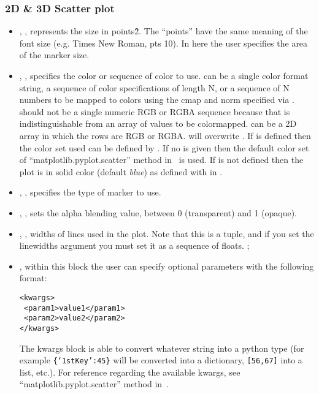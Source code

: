 \subsubsection{2D \& 3D Scatter plot}
  \begin{itemize}
    \item {}, , represents the size
    in points\^2. The ``points'' have the same meaning of the font size (e.g. Times New Roman, pts 10).
    In here the user specifies the area of the marker size.
    \item {}, , specifies the color or
    sequence of color to use.
     can be a single color format string, a sequence of color
    specifications of length N, or a sequence of N numbers to be mapped to
    colors using the cmap and norm specified via .
    \nb {} should not be a single numeric RGB or RGBA sequence because
    that is indistinguishable from an array of values to be colormapped.
     can be a 2D array in which the rows are RGB or RGBA.
    \nb {} will  overwrite .  If  is defined then the color set used can be defined by .
    If no  is given then the default color set of  ``matplotlib.pyplot.scatter'' method in~\cite{MatPlotLib} is used.
    If  is not defined then the plot is in solid color (default \textit{blue}) as defined with  in .
   \item {}, , specifies the type
    of marker to use.
    \item {}, , sets the alpha
    blending value, between 0 (transparent) and 1 (opaque).
    \item {}, , widths of
    lines used in the plot.
    Note that this is a tuple, and if you set the linewidths argument you must
    set it as a sequence of floats.
    ;
    \item {}, within this block the user can specify optional parameters
    with the following format:

\begin{lstlisting}[style=XML]
<kwargs>
 <param1>value1</param1>
 <param2>value2</param2>
</kwargs>
\end{lstlisting}

  The kwargs block is able to convert whatever string into a python type (for
  example  \texttt{\{`1stKey':45\}} will
  be converted into a dictionary,
  \texttt{[56,67]}  into a list, etc.).
    For reference regarding the available kwargs, see
    ``matplotlib.pyplot.scatter'' method in~\cite{MatPlotLib}.
  \end{itemize}

